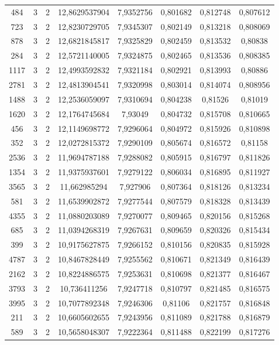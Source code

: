\begin{longtable}{|c|c|c|c|c|c|c|c|}
484 & 3 & 2 & 12,8629537904 & 7,9352756 & 0,801682 & 0,812748 & 0,807612 \\
723 & 3 & 2 & 12,8230729705 & 7,9345307 & 0,802149 & 0,813218 & 0,808069 \\
878 & 3 & 2 & 12,6821845817 & 7,9325829 & 0,802459 & 0,813532 & 0,80838 \\
284 & 3 & 2 & 12,5721140005 & 7,9324875 & 0,802465 & 0,813536 & 0,808385 \\
1117 & 3 & 2 & 12,4993592832 & 7,9321184 & 0,802921 & 0,813993 & 0,80886 \\
2781 & 3 & 2 & 12,4813904541 & 7,9320998 & 0,803014 & 0,814074 & 0,808956 \\
1488 & 3 & 2 & 12,2536059097 & 7,9310694 & 0,804238 & 0,81526 & 0,81019 \\
1620 & 3 & 2 & 12,1764745684 & 7,93049 & 0,804732 & 0,815708 & 0,810665 \\
456 & 3 & 2 & 12,1149698772 & 7,9296064 & 0,804972 & 0,815926 & 0,810898 \\
352 & 3 & 2 & 12,0272815372 & 7,9290109 & 0,805674 & 0,816572 & 0,81158 \\
2536 & 3 & 2 & 11,9694787188 & 7,9288082 & 0,805915 & 0,816797 & 0,811826 \\
1354 & 3 & 2 & 11,9375937601 & 7,9279122 & 0,806034 & 0,816895 & 0,811927 \\
3565 & 3 & 2 & 11,662985294 & 7,927906 & 0,807364 & 0,818126 & 0,813234 \\
581 & 3 & 2 & 11,6539902872 & 7,9277544 & 0,807579 & 0,818328 & 0,813439 \\
4355 & 3 & 2 & 11,0880203089 & 7,9270077 & 0,809465 & 0,820156 & 0,815268 \\
685 & 3 & 2 & 11,0394268319 & 7,9267631 & 0,809659 & 0,820326 & 0,815434 \\
399 & 3 & 2 & 10,9175627875 & 7,9266152 & 0,810156 & 0,820835 & 0,815928 \\
4787 & 3 & 2 & 10,8467828449 & 7,9255562 & 0,810671 & 0,821349 & 0,816439 \\
2162 & 3 & 2 & 10,8224886575 & 7,9253631 & 0,810698 & 0,821377 & 0,816467 \\
3793 & 3 & 2 & 10,736411256 & 7,9247718 & 0,810797 & 0,821485 & 0,816575 \\
3995 & 3 & 2 & 10,7077892348 & 7,9246306 & 0,81106 & 0,821757 & 0,816848 \\
211 & 3 & 2 & 10,6605602655 & 7,9243956 & 0,811089 & 0,821788 & 0,816879 \\
589 & 3 & 2 & 10,5658048307 & 7,9222364 & 0,811488 & 0,822199 & 0,817276 \\

\end{longtable}
